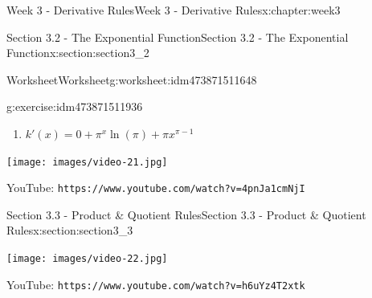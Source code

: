 \documentclass[oneside,10pt,]{book}
\newcommand{\mono}[1]{\texttt{#1}}
\numberwithin{equation}{section}
\newlength{\qrsize}
\newlength{\previewwidth}
\begin{document}
\begin{chapterptx}{Week 3 - Derivative Rules}{}{Week 3 - Derivative Rules}{}{}{x:chapter:week3}
\begin{sectionptx}{Section 3.2 - The Exponential Function}{}{Section 3.2 - The Exponential Function}{}{}{x:section:section3_2}
\begin{worksheet-subsection}{Worksheet}{}{Worksheet}{}{}{g:worksheet:idm473871511648}
\begin{divisionexercise}{1}{}{}{g:exercise:idm473871511936}
\begin{enumerate}[label=(\alph*)]
\item{}\(\displaystyle k'(x) = 0+\pi^x\ln(\pi)+\pi x^{\pi-1}\)%
\end{enumerate}
\end{divisionexercise}%
\end{worksheet-subsection}
\restoregeometry
\setlength{\qrsize}{9em}
\setlength{\previewwidth}{\linewidth}
\addtolength{\previewwidth}{-\qrsize}
\begin{tcbraster}[raster columns=2, raster column skip=1pt, raster halign=center, raster force size=false, raster left skip=0pt, raster right skip=0pt]%
\begin{tcolorbox}[previewstyle, width=\previewwidth]%
\texttt{[image: images/video-21.jpg]}%
\end{tcolorbox}%
\begin{tcolorbox}[qrstyle]%
{\hypersetup{urlcolor=black}}%
\end{tcolorbox}%
\begin{tcolorbox}[captionstyle]%
\small YouTube: \mono{https://www.youtube.com/watch?v=4pnJa1cmNjI}\end{tcolorbox}%
\end{tcbraster}%
\end{sectionptx}
%
%
\typeout{************************************************}
\typeout{************************************************}
%
\begin{sectionptx}{Section 3.3 - Product \& Quotient Rules}{}{Section 3.3 - Product \& Quotient Rules}{}{}{x:section:section3_3}
\setlength{\qrsize}{9em}
\setlength{\previewwidth}{\linewidth}
\addtolength{\previewwidth}{-\qrsize}
\begin{tcbraster}[raster columns=2, raster column skip=1pt, raster halign=center, raster force size=false, raster left skip=0pt, raster right skip=0pt]%
\begin{tcolorbox}[previewstyle, width=\previewwidth]%
\texttt{[image: images/video-22.jpg]}%
\end{tcolorbox}%
\begin{tcolorbox}[qrstyle]%
{\hypersetup{urlcolor=black}}%
\end{tcolorbox}%
\begin{tcolorbox}[captionstyle]%
\small YouTube: \mono{https://www.youtube.com/watch?v=h6uYz4T2xtk}\end{tcolorbox}%
\end{tcbraster}%

\end{sectionptx}
\end{chapterptx}
\end{document}
